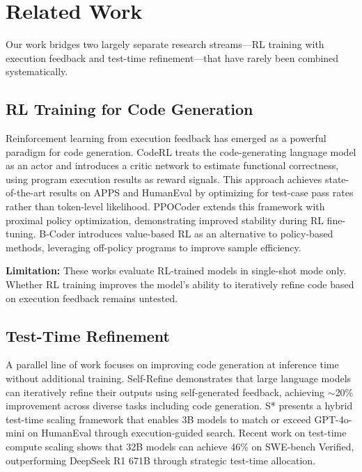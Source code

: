 \section{Related Work}
\label{sec:related}

Our work bridges two largely separate research streams---RL training with execution feedback and test-time refinement---that have rarely been combined systematically.

\subsection{RL Training for Code Generation}

Reinforcement learning from execution feedback has emerged as a powerful paradigm for code generation. CodeRL \cite{le2022coderl} treats the code-generating language model as an actor and introduces a critic network to estimate functional correctness, using program execution results as reward signals. This approach achieves state-of-the-art results on APPS and HumanEval by optimizing for test-case pass rates rather than token-level likelihood. PPOCoder \cite{shojaee2023ppocoder} extends this framework with proximal policy optimization, demonstrating improved stability during RL fine-tuning. B-Coder \cite{yu2023bcoder} introduces value-based RL as an alternative to policy-based methods, leveraging off-policy programs to improve sample efficiency.

\textbf{Limitation:} These works evaluate RL-trained models in single-shot mode only. Whether RL training improves the model's ability to iteratively refine code based on execution feedback remains untested.

\subsection{Test-Time Refinement}

A parallel line of work focuses on improving code generation at inference time without additional training. Self-Refine \cite{madaan2023selfrefine} demonstrates that large language models can iteratively refine their outputs using self-generated feedback, achieving $\sim$20\% improvement across diverse tasks including code generation. S* \cite{li2025sstar} presents a hybrid test-time scaling framework that enables 3B models to match or exceed GPT-4o-mini on HumanEval through execution-guided search. Recent work on test-time compute scaling \cite{ma2025testtimescaling} shows that 32B models can achieve 46\% on SWE-bench Verified, outperforming DeepSeek R1 671B through strategic test-time allocation.

